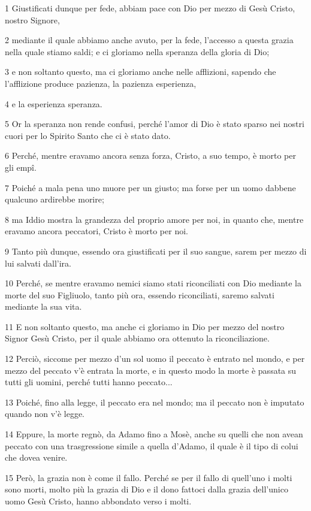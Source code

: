 \par 1 Giustificati dunque per fede, abbiam pace con Dio per mezzo di Gesù Cristo, nostro Signore,
\par 2 mediante il quale abbiamo anche avuto, per la fede, l'accesso a questa grazia nella quale stiamo saldi; e ci gloriamo nella speranza della gloria di Dio;
\par 3 e non soltanto questo, ma ci gloriamo anche nelle afflizioni, sapendo che l'afflizione produce pazienza, la pazienza esperienza,
\par 4 e la esperienza speranza.
\par 5 Or la speranza non rende confusi, perché l'amor di Dio è stato sparso nei nostri cuori per lo Spirito Santo che ci è stato dato.
\par 6 Perché, mentre eravamo ancora senza forza, Cristo, a suo tempo, è morto per gli empî.
\par 7 Poiché a mala pena uno muore per un giusto; ma forse per un uomo dabbene qualcuno ardirebbe morire;
\par 8 ma Iddio mostra la grandezza del proprio amore per noi, in quanto che, mentre eravamo ancora peccatori, Cristo è morto per noi.
\par 9 Tanto più dunque, essendo ora giustificati per il suo sangue, sarem per mezzo di lui salvati dall'ira.
\par 10 Perché, se mentre eravamo nemici siamo stati riconciliati con Dio mediante la morte del suo Figliuolo, tanto più ora, essendo riconciliati, saremo salvati mediante la sua vita.
\par 11 E non soltanto questo, ma anche ci gloriamo in Dio per mezzo del nostro Signor Gesù Cristo, per il quale abbiamo ora ottenuto la riconciliazione.
\par 12 Perciò, siccome per mezzo d'un sol uomo il peccato è entrato nel mondo, e per mezzo del peccato v'è entrata la morte, e in questo modo la morte è passata su tutti gli uomini, perché tutti hanno peccato...
\par 13 Poiché, fino alla legge, il peccato era nel mondo; ma il peccato non è imputato quando non v'è legge.
\par 14 Eppure, la morte regnò, da Adamo fino a Mosè, anche su quelli che non avean peccato con una trasgressione simile a quella d'Adamo, il quale è il tipo di colui che dovea venire.
\par 15 Però, la grazia non è come il fallo. Perché se per il fallo di quell'uno i molti sono morti, molto più la grazia di Dio e il dono fattoci dalla grazia dell'unico uomo Gesù Cristo, hanno abbondato verso i molti.
